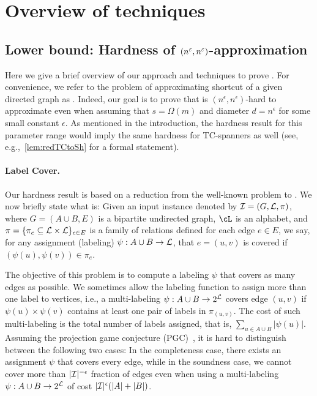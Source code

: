 \section{Overview of techniques}
\label{sec:overview}


\subsection{Lower bound: Hardness of \texorpdfstring{$(n^\varepsilon, n^\varepsilon)$}{(n,n)}-approximation}

Here we give a brief overview of our approach and techniques to prove . For convenience, we refer to the problem of approximating shortcut of a given directed graph as \os{}. Indeed, our goal is to prove that \os{} is $(n^{\epsilon}, n^{\epsilon})$-hard to approximate even when assuming that $s=\Omega(m)$ and diameter $d=n^{\epsilon}$ for some small constant $\epsilon$. As mentioned in the introduction, the hardness result for this parameter range would imply the same hardness for TC-spanners as well (see, e.g.,~\cref{lem:redTCtoSh} for a formal statement).

 

 
\paragraph{Label Cover.} Our hardness result is based on a reduction from the well-known \labcov{} problem  to \os{}. We now briefly state what \labcov{} is: Given an input instance denoted by $\mathcal{I} = (G,\mathcal{L}, \pi)$, where $G=(A \cup B,E)$ is a bipartite undirected graph, $\cL$ is an alphabet, and $\pi = \{\pi_e \subseteq  \mathcal{L} \times \mathcal{L}\}_{e \in E}$ is a family of relations defined for each edge $e \in E$, we say, for any assignment (labeling)  $\psi: A \cup B \rightarrow \mathcal{L}$, that $e=(u,v)$ is covered if $(\psi(u), \psi(v)) \in \pi_e$.

The objective of this problem is to compute a labeling $\psi$ that covers as many edges as possible. We sometimes allow the labeling function to assign more than one label to vertices, i.e., a multi-labeling $\psi: A \cup B \rightarrow 2^{\mathcal{L}}$ covers edge $(u,v)$ if $\psi(u) \times \psi(v)$ contains at least one pair of labels in $\pi_{(u,v)}$. The cost of such multi-labeling is the total number of labels assigned, that is, $\sum_{u \in A \cup B}|\psi(u)|$. 
Assuming the projection game conjecture (PGC)~\cite{Moshkovitz15}, it is hard to distinguish between the following two cases: In the completeness case, there exists an assignment $\psi$ that covers every edge,  while in the soundness case, we cannot cover more than $|\mathcal{I}|^{-\epsilon}$  fraction of edges even when using a multi-labeling $\psi:A \cup B \rightarrow 2^{\mathcal{L}}$ of cost $|\mathcal{I}|^{\epsilon}(|A|+|B|)$. 





